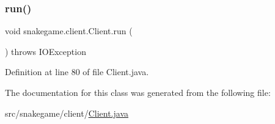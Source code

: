 \subsubsection{\texorpdfstring{run()}{run()}}
{\footnotesize\ttfamily void snakegame.\+client.\+Client.\+run (\begin{DoxyParamCaption}{ }\end{DoxyParamCaption}) throws I\+O\+Exception}



Definition at line 80 of file Client.\+java.



The documentation for this class was generated from the following file\+:\begin{DoxyCompactItemize}
\item 
src/snakegame/client/\mbox{\hyperlink{_client_8java}{Client.\+java}}\end{DoxyCompactItemize}
